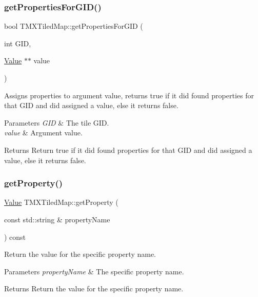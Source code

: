 \subsubsection{\texorpdfstring{get\+Properties\+For\+G\+I\+D()}{getPropertiesForGID()}\hspace{0.1cm}{\footnotesize\ttfamily [4/4]}}
{\footnotesize\ttfamily bool T\+M\+X\+Tiled\+Map\+::get\+Properties\+For\+G\+ID (\begin{DoxyParamCaption}\item[{int}]{G\+ID,  }\item[{\hyperlink{classValue}{Value} $\ast$$\ast$}]{value }\end{DoxyParamCaption})}

Assigns properties to argument value, returns true if it did found properties for that G\+ID and did assigned a value, else it returns false.


\begin{DoxyParams}{Parameters}
{\em G\+ID} & The tile G\+ID. \\
\hline
{\em value} & Argument value. \\
\hline
\end{DoxyParams}
\begin{DoxyReturn}{Returns}
Return true if it did found properties for that G\+ID and did assigned a value, else it returns false. 
\end{DoxyReturn}
\mbox{\label{classTMXTiledMap_a4628b8ea7514e6f12e292b68f8e808ae}} 
\subsubsection{\texorpdfstring{get\+Property()}{getProperty()}\hspace{0.1cm}{\footnotesize\ttfamily [1/2]}}
{\footnotesize\ttfamily \hyperlink{classValue}{Value} T\+M\+X\+Tiled\+Map\+::get\+Property (\begin{DoxyParamCaption}\item[{const std\+::string \&}]{property\+Name }\end{DoxyParamCaption}) const}

Return the value for the specific property name.


\begin{DoxyParams}{Parameters}
{\em property\+Name} & The specific property name. \\
\hline
\end{DoxyParams}
\begin{DoxyReturn}{Returns}
Return the value for the specific property name. 
\end{DoxyReturn}
\mbox{\label{classTMXTiledMap_a4628b8ea7514e6f12e292b68f8e808ae}} 
